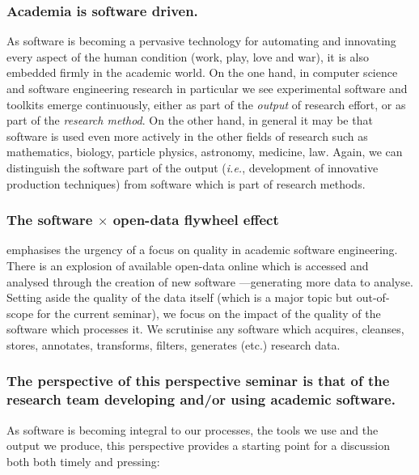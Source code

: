 \documentclass[a4paper,UKenglish]{dagman}
\renewcommand{\paragraph}[1]{\subsubsection*{#1}\xspace}
\newcommand{\ie}{\emph{i.e.},\xspace}
\begin{document}
\paragraph{Academia is software driven.} As software is becoming a pervasive technology for automating and innovating every aspect of the human condition (work, play, love and war), it is also embedded firmly in the academic world. On the one hand, in computer science and software engineering research in particular we see experimental software and toolkits emerge continuously, either as part of the \emph{output} of research effort, or as part of the \emph{research method}. On the other hand, in general it may be that software is used even more actively in the other fields of research such as mathematics, biology, particle physics, astronomy, medicine, law. Again, we can distinguish the software part of the output (\ie development of innovative production techniques) from software which is part of research methods. 

\paragraph{The software $\times$ open-data flywheel effect} emphasises the urgency of a focus on quality in academic software engineering. There is an explosion of available open-data online which is accessed and analysed through the creation of new software ---generating more data to analyse. Setting aside the quality of the data itself (which is a major topic but out-of-scope for the current seminar), we focus on the impact of the quality of the software which processes it. We scrutinise any software which acquires, cleanses, stores, annotates, transforms, filters, generates (etc.) research data.

\paragraph{The perspective of this perspective seminar is that of the research team developing and/or using academic software.} As software is becoming integral to our processes, the tools we use and the output we produce, this perspective provides a starting point for a discussion both both timely and pressing:
\end{document}
